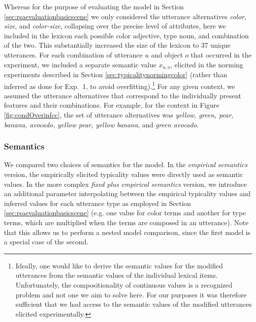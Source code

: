 \documentclass[11pt]{article}
\newcommand{\figref}[1]{Figure \ref{#1}}
\newcommand{\sectionref}[1]{Section \ref{#1}}
\begin{document}
Whereas for the purpose of evaluating the model in \sectionref{sec:rsaevaluationbasicscene}  we only considered the utterance alternatives \emph{color}, \emph{size}, and \emph{color-size}, collapsing over the precise level of attributes, here we included in the lexicon each possible color adjective, type noun, and combination of the two. This substantially increased the size of the lexicon to 37 unique utterances. For each combination of utterance $u$ and object $o$ that occurred in the experiment, we included a separate semantic value $x_{u,o}$, elicited in the norming experiments described in \sectionref{sec:typicalitynormingcolor} (rather than inferred as done for Exp.~1, to avoid overfitting).\footnote{Ideally, one would like to derive the semantic values for the modified utterances from the semantic values of the individual lexical items.  Unfortunately, the compositionality of continuous values is a recognized problem \cite{kamp1995} and not one we aim to solve here. For our purposes it was therefore sufficient that we had access to the semantic values of the modified utterances elicited experimentally.} For any given context, we assumed the utterance alternatives that correspond to the individually present features and their combinations. For example, for the context in \figref{fig:condOverinfcc}, the set of utterance alternatives was \emph{yellow, green, pear, banana, avocado, yellow pear, yellow banana}, and \emph{green avocado}. 

\subsubsection{Semantics}

We compared two choices of semantics for the model.
In the \emph{empirical semantics} version, the empirically elicited typicality values were directly used as semantic values.
In the more complex \emph{fixed plus empirical semantics} version, we introduce an additional parameter interpolating between the empirical typicality values and inferred values for each utterance type as  employed in \sectionref{sec:rsaevaluationbasicscene} (e.g. one value for color terms and another for type terms, which are multiplied when the terms are composed in an utterance).
Note that this allows us to perform a nested model comparison, since the first model is a special case of the second.
\end{document}
